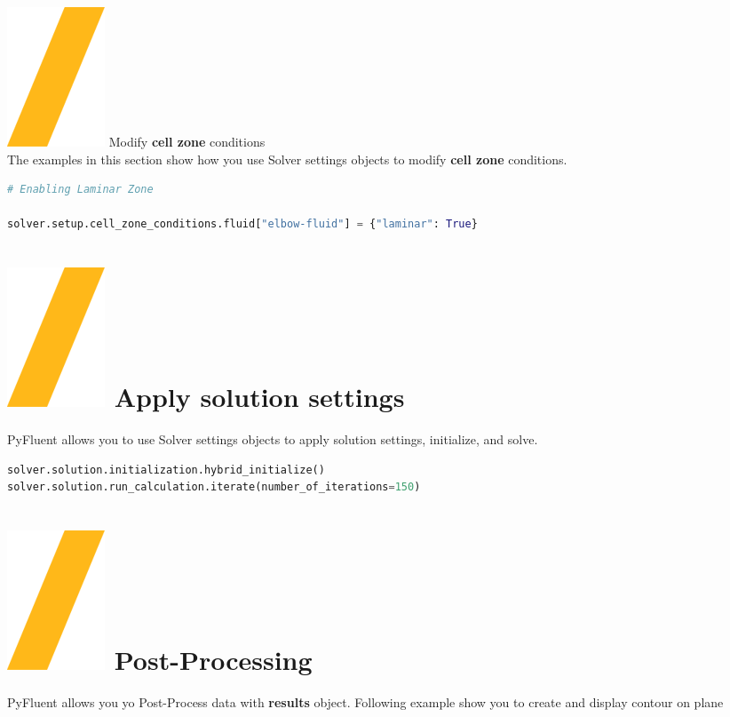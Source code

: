 \documentclass[9pt,landscape]{article}
\begin{document}
\begin{multicols}{3}
{\vfill
{\includegraphics[height=\fontcharht\font`\S]{slash.png}  Modify \textbf{cell zone} conditions} \\
The examples in this section show how you use Solver settings objects to modify \textbf{cell zone} conditions.
\begin{lstlisting}[language=Python]
# Enabling Laminar Zone

solver.setup.cell_zone_conditions.fluid["elbow-fluid"] = {"laminar": True}  
\end{lstlisting}
\vfill

\vfill
\section{\includegraphics[height=\fontcharht\font`\S]{slash.png}  Apply solution settings}
PyFluent allows you to use Solver settings objects to apply
solution settings, initialize, and solve.

\begin{lstlisting}[language=Python]
solver.solution.initialization.hybrid_initialize()
solver.solution.run_calculation.iterate(number_of_iterations=150)
\end{lstlisting}

\section{\includegraphics[height=\fontcharht\font`\S]{slash.png}  Post-Processing}
PyFluent allows you yo Post-Process data with \textbf{results} object. Following example show you to create and display contour on plane

}
\end{multicols}
\end{document}
